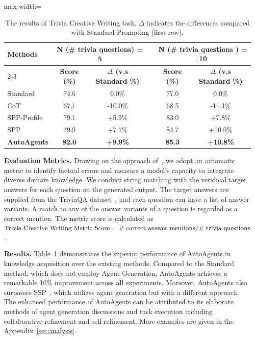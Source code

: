 \begin{table}[!htbp]
\caption{The results of Trivia Creative Writing task. $\Delta$ indicates the differences compared with Standard Prompting (first row).}
\label{tab:trivia}
\centering
\begin{adjustbox}{max width=\linewidth}
\begin{tabular}{lccccc}
\toprule
\multirow{2}{*}{\textbf{Methods}} &\multicolumn{2}{c}{\textbf{N (\# trivia questions) = 5 }} && \multicolumn{2}{c}{\textbf{N (\# trivia questions ) = 10}} \\
\cmidrule{2-3}\cmidrule{5-6}
& \textbf{Score (\%)} & \textbf{$\Delta$ (v.s Standard \%)} & & \textbf{Score (\%)} & \textbf{$\Delta$ (v.s Standard \%)} \\
\midrule
Standard & 74.6 & 0.0\% && 77.0 & 0.0\% \\ 
CoT~\cite{yao2023tree} & 67.1 & \textcolor{textred}{-10.0\%} && 68.5 & \textcolor{textred}{-11.1\%}\\
SPP-Profile~\cite{wang2023unleashing} & 79.1 & \textcolor{textgreen}{+5.9\%} && 83.0 & \textcolor{textgreen}{+7.8\%} \\
SPP~\cite{wang2023unleashing} & 79.9 & \textcolor{textgreen}{+7.1\%} && 84.7 & \textcolor{textgreen}{+10.0\%} \\
\textbf{AutoAgents} & \textbf{82.0} & \textcolor{textgreen}{\textbf{+9.9\%}} && \textbf{85.3} & \textcolor{textgreen}{\textbf{+10.8\%}}\\
\bottomrule
\end{tabular}
\end{adjustbox}
\end{table}

\textbf{Evaluation Metrics.} Drawing on the approach of~\cite{wang2023unleashing}, we adopt an automatic metric to identify factual errors and measure a model’s capacity to integrate diverse domain knowledge. We conduct string matching with the veridical target answers for each question on the generated output. The target answers are supplied from the TriviaQA dataset~\cite{joshi2017triviaqa}, and each question can have a list of answer variants. A match to any of the answer variants of a question is regarded as a correct mention. The metric score is calculated as $\text{Trivia Creative Writing{} Metric Score} = {\text{\# correct answer mentions}} / {\text{\# trivia questions}}$.



\textbf{Results.}
Table~\ref{tab:trivia} demonstrates the superior performance of AutoAgents in knowledge acquisition over the existing methods. Compared to the Standard method, which does not employ Agent Generation, AutoAgents achieves a remarkable 10\% improvement across all experiments. Moreover, AutoAgents also surpasses SSP~\cite{wang2023unleashing}, which utilizes agent generation but with a different approach. The enhanced performance of AutoAgents can be attributed to its elaborate methods of agent generation discussions and task execution including collaborative refinement and self-refinement. More examples are given in the Appendix~\ref{sec:analysis}.


